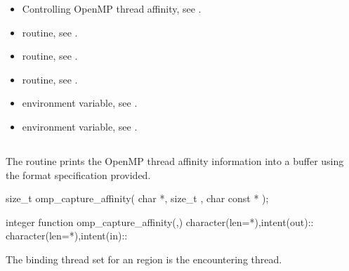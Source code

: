 \crossreferences
\begin{itemize}
\item Controlling OpenMP thread affinity, see
.
\item {} routine, see .
\item {} routine, see .
\item {} routine, see .
\item {} environment variable, see
.
\item {} environment variable, see
.
\end{itemize}


\subsection{}
\label{subsec:omp_capture_affinity}

\summary
The  routine prints the OpenMP thread affinity information into a buffer using
the format specification provided.


\format
\begin{ccppspecific}
\begin{ompcFunction}
size_t omp_capture_affinity(
  char *,
  size_t ,
  char const *
);
\end{ompcFunction}
\end{ccppspecific}

\begin{fortranspecific}
\begin{ompfFunction}
integer function omp_capture_affinity(,)
character(len=*),intent(out)::
character(len=*),intent(in)::
\end{ompfFunction}
\end{fortranspecific}

\binding
The binding thread set for an  region is the encountering thread.

